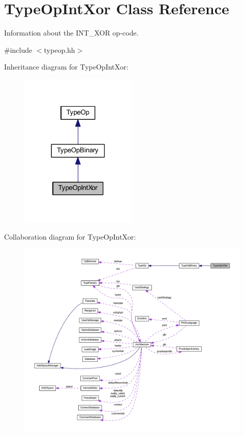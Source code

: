 \hypertarget{class_type_op_int_xor}{}\section{Type\+Op\+Int\+Xor Class Reference}
\label{class_type_op_int_xor}


Information about the I\+N\+T\+\_\+\+X\+OR op-\/code.  




{\ttfamily \#include $<$typeop.\+hh$>$}



Inheritance diagram for Type\+Op\+Int\+Xor\+:
\nopagebreak
\begin{figure}[H]
\begin{center}
\leavevmode
\includegraphics[width=158pt]{class_type_op_int_xor__inherit__graph}
\end{center}
\end{figure}


Collaboration diagram for Type\+Op\+Int\+Xor\+:
\nopagebreak
\begin{figure}[H]
\begin{center}
\leavevmode
\includegraphics[width=350pt]{class_type_op_int_xor__coll__graph}
\end{center}
\end{figure}
